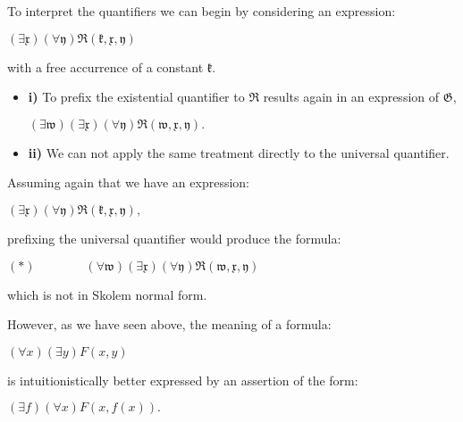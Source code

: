 \documentclass[12pt]{article}
\begin{document}
To interpret the quantifiers we can begin by considering an expression:

\begin{center} 
$(\exists \mathfrak{x}) (\forall \mathfrak{y}) \mathfrak{R} (\mathfrak{k}, \mathfrak{x}, \mathfrak{y})$
\end{center}

with a free accurrence of a constant $\mathfrak{k}$.

\begin{itemize}
\item \textbf{i)} To prefix the existential quantifier to $\mathfrak{R}$ results again in an expression of $\mathfrak{G}$,

\begin{center}
$(\exists \mathfrak{w}) (\exists \mathfrak{x}) (\forall \mathfrak{y}) \mathfrak{R} (\mathfrak{w}, \mathfrak{x}, \mathfrak{y}).$
\end{center}

\item \textbf{ii)} We can not apply the same treatment directly to the universal quantifier.
\end{itemize}

Assuming again that we have an expression:

\begin{center}
$(\exists \mathfrak{x}) (\forall \mathfrak{y}) \mathfrak{R} (\mathfrak{k}, \mathfrak{x}, \mathfrak{y}),$
\end{center}

prefixing the universal quantifier would produce the formula:

\begin{center}
$(\ast) \qquad \qquad (\forall \mathfrak{w}) (\exists \mathfrak{x}) (\forall \mathfrak{y}) \mathfrak{R} (\mathfrak{w}, \mathfrak{x}, \mathfrak{y})$
\end{center}

which is not in Skolem normal form.

However, as we have seen above, the meaning of a formula:

\begin{center}
$(\forall x) (\exists y) F (x, y)$
\end{center}

is intuitionistically better expressed by an assertion of the form:

\begin{center}
$(\exists f) (\forall x) F (x, f (x)).$
\end{center}
\end{document}
